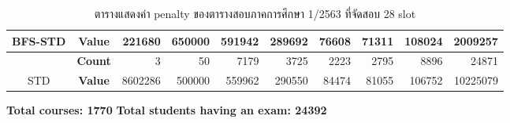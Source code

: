 \begin{table}[]
{\begin{tabular}{@{}ccrrrrrrrr@{}}
    \multirow{-2}{*}{{BFS-STD}} & {\textbf{Value}} & {221680}  & {650000} & {591942} & {289692} & {76608}  & {71311}  & {108024} & {2009257}  \\ \midrule
                                                      & {\textbf{Count}} & {3}       & {50}     & {7179}   & {3725}   & {2223}   & {2795}   & {8896}   & {24871}    \\ \cmidrule(l){2-10} 
    \multirow{-2}{*}{STD}     & {\textbf{Value}} & {8602286} & {500000} & {559962} & {290550} & {84474}  & {81055}  & {106752} & {10225079} \\ \bottomrule
    \end{tabular}%
    }
    \caption{ตารางแสดงค่า penalty ของตารางสอบภาคการศึกษา 1/2563 ที่จัดสอบ 28 slot}
    \label{tab:result_table_163_28}
\end{table}
\begin{table}[]
    \centering
    \textbf{Total courses: 1770} \quad \quad \textbf{Total students having an exam: 24392}
\end{table}
